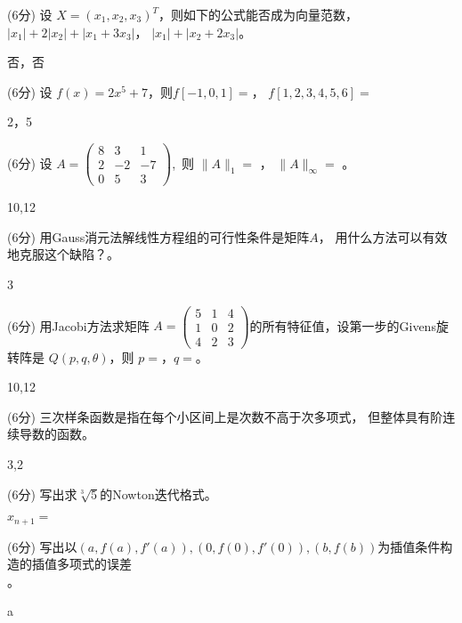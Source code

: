 \documentclass[12pt,letter]{ustcexam}
\def\ds{\displaystyle}
\begin{document}
\begin{problems}
\qu (6分) 设 $X=(x_1,x_2,x_3)^T$，则如下的公式能否成为向量范数， \\
$|x_1|+2|x_2|+|x_1+3x_3|$\twob\oneb ，
$|x_1|+|x_2+2x_3|$\twob\oneb 。
\begin{sol}
 否，否
\end{sol}

\qu (6分) 设 $ f(x)=2x^5+7 $，则$f[-1,0,1]=$\twob\twob ，
$f[1,2,3,4,5,6]=$ \twob\twob
\begin{sol}
 2，5
\end{sol}

\question (6分) 设 $ \ds{A=\begin {pmatrix} 8 & 3 & 1 \\
2 & -2 & -7 \\ 0 & 5 & 3 \end {pmatrix}}$,\  则 $ \|A\|_1=$ \sixb ，
$ \|A\|_\infty =$ \sixb 。
\begin{sol}
10,12
\end{sol}

\qu (6分) 用Gauss消元法解线性方程组的可行性条件是矩阵$A$\tenb\fourb，
用什么方法可以有效地克服这个缺陷？\fourb\fourb。
\begin{sol}
3  
\end{sol}

\question (6分) 用Jacobi方法求矩阵 $ \ds{A=\begin {pmatrix} 5 & 1 & 4 \\
1 & 0 & 2 \\ 4 & 2 & 3 \end {pmatrix}}$的所有特征值，设第一步的Givens旋转阵是
$Q(p,q,\theta)$，则 $p=$\fourb ，$q=$\fourb 。
\begin{sol}
10,12
\end{sol}

\qu (6分) 三次样条函数是指在每个小区间上是次数不高于\twob 次多项式，
但整体具有\twob 阶连续导数的函数。
\begin{sol}
3,2
\end{sol}

\qu (6分) 写出求$\sqrt[3]{5}$的Nowton迭代格式。\tenb\tenb
\begin{sol}
$x_{n+1}=$
\end{sol}

\qu (6分) 写出以$(a,f(a),f'(a)),(0,f(0),f'(0)),(b,f(b))$为插值条件构造的插值多项式的误差\\ \sixb\sixb\tenb 。
\begin{sol}
a
\end{sol}


\end{problems}
\end{document}
